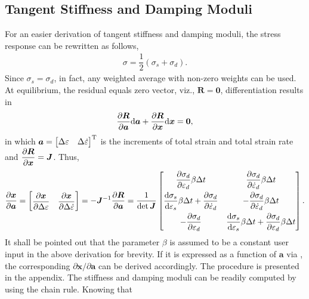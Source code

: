 \subsection{Tangent Stiffness and Damping Moduli}
For an easier derivation of tangent stiffness and damping moduli, the stress response can be rewritten as follows,
\begin{gather}
\sigma=\dfrac{1}{2}\left(\sigma_s+\sigma_d\right).
\end{gather}
Since $\sigma_s=\sigma_d$, in fact, any weighted average with non-zero weights can be used. At equilibrium, the residual equals zero vector, viz., $\mathbold{R}=\mathbold{0}$, differentiation results in
\begin{gather}
\dfrac{\partial\bm{R}}{\partial\bm{a}}\mathrm{d}\bm{a}+\dfrac{\partial\bm{R}}{\partial\bm{x}}\mathrm{d}\bm{x}=\bm{0},
\end{gather}
in which $\bm{a}=\begin{bmatrix}
\Delta\varepsilon&\Delta\dot\varepsilon
\end{bmatrix}^{\mathrm{T}}$ is the increments of total strain and total strain rate and $\dfrac{\partial\bm{R}}{\partial\bm{x}}=\bm{J}$. Thus,
\begin{gather}\label{eq:internal}
\dfrac{\partial\bm{x}}{\partial\bm{a}}=\begin{bmatrix}\dfrac{\partial\bm{x}}{\partial\Delta\varepsilon}&\dfrac{\partial\bm{x}}{\partial\Delta\dot\varepsilon}\end{bmatrix}=-\bm{J}^{-1}\dfrac{\partial\bm{R}}{\partial\bm{a}}=\dfrac{1}{\det{\bm{J}}}\begin{bmatrix}
	\dfrac{\partial\sigma_d}{\partial\varepsilon_d}\beta\Delta{}t                                               & \dfrac{\partial\sigma_d}{\partial\dot\varepsilon_d}\beta\Delta{}t                                                     \\[3mm]
	\dfrac{\mathrm{d}\sigma_s}{\mathrm{d}\varepsilon_s}\beta\Delta{}t+\dfrac{\partial\sigma_d}{\partial\dot\varepsilon_d} & -\dfrac{\partial\sigma_d}{\partial\dot\varepsilon_d}\beta\Delta{}t                                                    \\[3mm]
	-\dfrac{\partial\sigma_d}{\partial\varepsilon_d}                                                            & \dfrac{\mathrm{d}\sigma_s}{\mathrm{d}\varepsilon_s}\beta\Delta{}t+\dfrac{\partial\sigma_d}{\partial\varepsilon_d}\beta\Delta{}t
\end{bmatrix}.
\end{gather}
It shall be pointed out that the parameter $\beta$ is assumed to be a constant user input in the above derivation for brevity. If it is expressed as a function of $\mathbold{a}$ via , the corresponding $\partial\mathbold{x}/\partial\mathbold{a}$ can be derived accordingly. The procedure is presented in the appendix. The stiffness and damping moduli can be readily computed by using the chain rule. Knowing that
